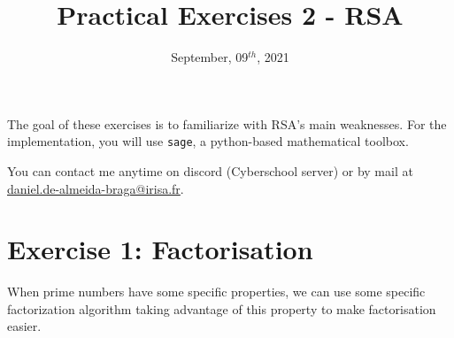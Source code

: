 \documentclass[english,a4paper,11pt]{exam}
\title{\textbf{Practical Exercises 2 - RSA}}
\date{September, 09$^{th}$, 2021}
\begin{document}
	
	\maketitle
	
	The goal of these exercises is to familiarize with RSA's main weaknesses. For the implementation, you will use  \texttt{sage}, a python-based mathematical toolbox.
	
	You can contact me anytime on discord (Cyberschool server) or by mail at \url{daniel.de-almeida-braga@irisa.fr}.

	
	
	\section*{Exercise 1: Factorisation}
	
	When prime numbers have some specific properties, we can use some specific factorization algorithm taking advantage of this property to make factorisation easier. 
	
	\begin{center}
		\vspace{0.2cm}
	\end{center}
	
\end{document}
